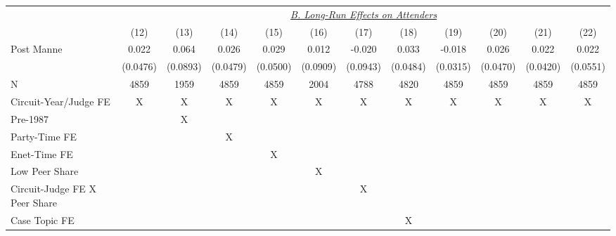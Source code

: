 \begin{center}
{\begin{tabular}{l*{11}{c}}
                    &\multicolumn{11}{c}{\uline{\textit{B. Long-Run Effects on Attenders}}}                                                                                              \\
                    &        (12)  &        (13)  &        (14)  &        (15)  &        (16)  &        (17)  &        (18)  &        (19)  &        (20)  &        (21)  &        (22)  \\
\cmidrule(lr){2-12}
Post Manne          &       0.022  &       0.064  &       0.026  &       0.029  &       0.012  &      -0.020  &       0.033  &      -0.018  &       0.026  &       0.022  &       0.022  \\
                    &    (0.0476)  &    (0.0893)  &    (0.0479)  &    (0.0500)  &    (0.0909)  &    (0.0943)  &    (0.0484)  &    (0.0315)  &    (0.0470)  &    (0.0420)  &    (0.0551)  \\
\cmidrule(lr){1-12}
N                   &        4859  &        1959  &        4859  &        4859  &        2004  &        4788  &        4820  &        4859  &        4859  &        4859  &        4859  \\
Circuit-Year/Judge FE&           X  &           X  &           X  &           X  &           X  &           X  &           X  &           X  &           X  &           X  &           X  \\
Pre-1987            &              &           X  &              &              &              &              &              &              &              &              &              \\
Party-Time FE       &              &              &           X  &              &              &              &              &              &              &              &              \\
Enet-Time FE        &              &              &              &           X  &              &              &              &              &              &              &              \\
Low Peer Share      &              &              &              &              &           X  &              &              &              &              &              &              \\
Circuit-Judge FE X Peer Share&              &              &              &              &              &           X  &              &              &              &              &              \\
Case Topic FE       &              &              &              &              &              &              &           X  &              &              &              &              \\

\end{tabular}}
\end{center}
